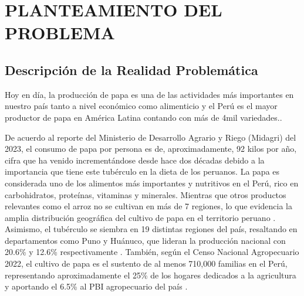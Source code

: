\chapter{PLANTEAMIENTO DEL PROBLEMA}
\section{Descripción de la Realidad Problemática}


Hoy en día, la producción de papa es una de las actividades más importantes en nuestro país tanto a nivel económico como alimenticio y el Perú es el mayor productor de papa en América Latina contando con más de 4mil variedades.\parencite{cr_elcomercioproduccionpapa}.  


De acuerdo al reporte del Ministerio de Desarrollo Agrario y Riego (Midagri) del 2023, el consumo de papa por persona es de, aproximadamente, 92 kilos por año, cifra que ha venido incrementándose desde hace dos décadas debido a la importancia que tiene este tubérculo en la dieta de los peruanos. La papa es considerada uno de los alimentos más importantes y nutritivos en el Perú, rico en carbohidratos, proteínas, vitaminas y minerales.  Mientras que otros productos relevantes como el arroz no se cultivan en más de 7 regiones, lo que evidencia la amplia distribución geográfica del cultivo de papa en el territorio peruano \parencite{cr_agroinforma1}. Asimismo, el tubérculo se siembra en 19 distintas regiones del país, resaltando en departamentos como Puno y Huánuco, que lideran la producción nacional con 20.6\% y 12.6\% respectivamente \parencite{minagri_estadisticas_2022}. También, según el Censo Nacional Agropecuario 2022, el cultivo de papa es el sustento de al menos 710,000 familias en el Perú, representando aproximadamente el 25\% de los hogares dedicados a la agricultura y aportando el 6.5\% al PBI agropecuario del país \parencite{inei_cenagro_2022}.

